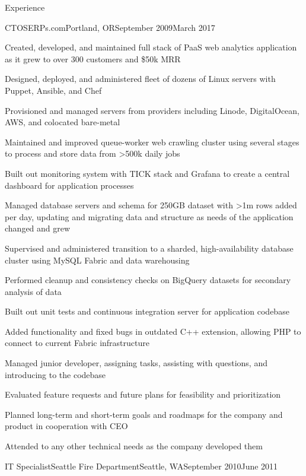\documentclass[letterpaper,10pt]{article}
\begin{document}
\begin{res_section}{Experience}
\begin{res_experienceitem}{CTO}{SERPs.com}{Portland, OR}{September 2009}{March 2017}
  \item Created, developed, and maintained full stack of PaaS web analytics application as it grew to over 300 customers and \$50k MRR
  \item Designed, deployed, and administered fleet of dozens of Linux servers with Puppet, Ansible, and Chef
  \item Provisioned and managed servers from providers including Linode, DigitalOcean, AWS, and colocated bare-metal
  \item Maintained and improved queue-worker web crawling cluster using several stages to process and store data from \textgreater500k daily jobs
  \item Built out monitoring system with TICK stack and Grafana to create a central dashboard for application processes
  \item Managed database servers and schema for 250GB dataset with \textgreater1m rows added per day, updating and migrating data and structure as needs of the application changed and grew
  \item Supervised and administered transition to a sharded, high-availability database cluster using MySQL Fabric and data warehousing
  \item Performed cleanup and consistency checks on BigQuery datasets for secondary analysis of data
  \item Built out unit tests and continuous integration server for application codebase
  \item Added functionality and fixed bugs in outdated C++ extension, allowing PHP to connect to current Fabric infrastructure
  \item Managed junior developer, assigning tasks, assisting with questions, and introducing to the codebase
  \item Evaluated feature requests and future plans for feasibility and prioritization
  \item Planned long-term and short-term goals and roadmaps for the company and product in cooperation with CEO
  \item Attended to any other technical needs as the company developed them
\end{res_experienceitem}
\begin{res_experienceitem}{IT Specialist}{Seattle Fire Department}{Seattle, WA}{September 2010}{June 2011}

\end{res_experienceitem}
\end{res_section}
\end{document}
